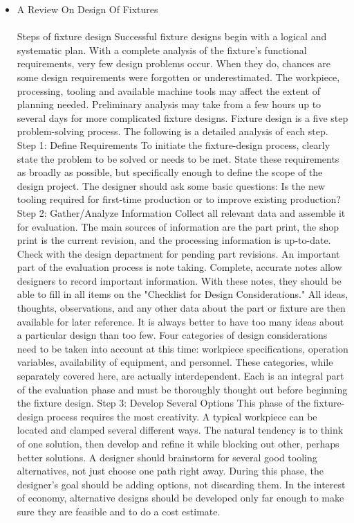 \documentclass[16pt,a4paper]{article}
\begin{document}
\begin{itemize}
\item A Review On Design Of Fixtures\\
\\Steps of fixture design Successful fixture designs begin with a logical and systematic plan. With a complete analysis of the fixture's functional requirements, very few design problems occur. When they do, chances are some design requirements were forgotten or underestimated. The workpiece, processing, tooling and available machine tools may affect the extent of planning needed. Preliminary analysis may take from a few hours up to several days for more complicated fixture designs. Fixture design is a five step problem-solving process. The following is a detailed analysis of each step. Step 1: Define Requirements To initiate the fixture-design process, clearly state the problem to be solved or needs to be met. State these requirements as broadly as possible, but specifically enough to define the scope of the design project. The designer should ask some basic questions: Is the new tooling required for first-time production or to improve existing production? Step 2: Gather/Analyze Information Collect all relevant data and assemble it for evaluation. The main sources of information are the part print, the shop print is the current revision, and the processing information is up-to-date. Check with the design department for pending part revisions. An important part of the evaluation process is note taking. Complete, accurate notes allow designers to record important information. With these notes, they should be able to fill in all items on the "Checklist for Design Considerations." All ideas, thoughts, observations, and any other data about the part or fixture are then available for later reference. It is always better to have too many ideas about a particular design than too few. Four categories of design considerations need to be taken into account at this time: workpiece specifications, operation variables, availability of equipment, and personnel. These categories, while separately covered here, are actually interdependent. Each is an integral part of the evaluation phase and must be thoroughly thought out before beginning the fixture design. Step 3: Develop Several Options This phase of the fixture-design process requires the most creativity. A typical workpiece can be located and clamped several different ways. The natural tendency is to think of one solution, then develop and refine it while blocking out other, perhaps better solutions. A designer should brainstorm for several good tooling alternatives, not just choose one path right away. During this phase, the designer's goal should be adding options, not discarding them. In the interest of economy, alternative designs should be developed only far enough to make sure they are feasible and to do a cost estimate. 

\end{itemize}
\end{document}
